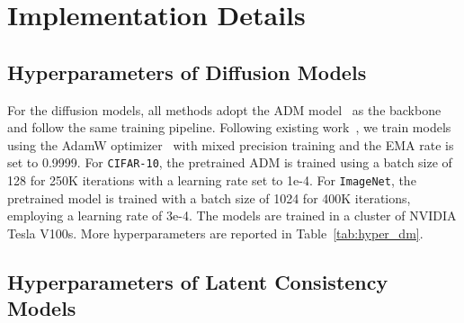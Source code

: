 

\section{Implementation Details}
\subsection{Hyperparameters of Diffusion Models}\label{app:hyper_dm}
For the diffusion models, all methods adopt the ADM model~\citep{dhariwal2021diffusion} as the backbone and follow the same training pipeline.
Following existing work~\citep{dhariwal2021diffusion,diffusion-ip}, we train models using the AdamW optimizer~\citep{adamw} with mixed precision training and the EMA rate is set to 0.9999.
For \texttt{CIFAR-10}, the pretrained ADM is trained using a batch size of 128 for 250K iterations with a learning rate set to 1e-4.
For \texttt{ImageNet}, the pretrained model is trained with a batch size of 1024 for 400K iterations, employing a learning rate of 3e-4.
The models are trained in a cluster of NVIDIA Tesla V100s.
More hyperparameters are reported in Table~\ref{tab:hyper_dm}. 



\subsection{Hyperparameters of Latent Consistency Models}\label{app:hyper_lcm}

